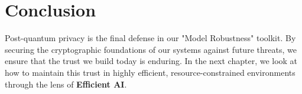 \section{Conclusion}
\label{sec:conclusion_quantum}

Post-quantum privacy is the final defense in our "Model Robustness" toolkit. By securing the cryptographic foundations of our systems against future threats, we ensure that the trust we build today is enduring. In the next chapter, we look at how to maintain this trust in highly efficient, resource-constrained environments through the lens of \textbf{Efficient AI}.



